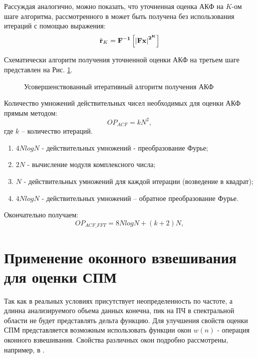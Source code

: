Рассуждая аналогично, можно показать, что уточненная оценка АКФ на ${K}$-ом шаге алгоритма, рассмотренного в \cite{ostanin_akf}
может быть получена без использования итераций с помощью выражения:
\begin{equation}
	\label{eq:akf_3}
	\hat{\bf{r}}_K = \bf{F}^{-1}\left[ \left| \bf{Fx} \right| ^{2^K} \right]
\end{equation}

Схематически алгоритм получения уточненной оценки АКФ на третьем шаге представлен на Рис. \ref{pic:akf_pic}.

\begin{figure}[h]
	\center{}
	\caption{Усовершенствованный итеративный алгоритм получения АКФ}
	\label{pic:akf_pic}
\end{figure}

Количество умножений действительных чисел необходимых для оценки АКФ прямым методом: 
\begin{equation}
	\label{eq:num_of_op_acf}
	OP_{ACF}=kN^2,
\end{equation}
где ${k}$  – количество итераций.

\begin{enumerate}
\item ${4NlogN}$ - действительных умножений - преобразование Фурье;
\item ${2N}$ - вычисление модуля комплексного числа;
\item ${N}$ - действительных умножений для каждой итерации (возведение в квадрат);
\item ${4NlogN}$ - действительных умножений – обратное преобразование Фурье. 
\end{enumerate}

Окончательно получаем:
\begin{equation}
	\label{eq:num_of_op_acf}
	OP_{ACF\_FFT}=8NlogN + (k+2)N,
\end{equation}

\section{Применение оконного взвешивания для оценки СПМ}

Так как в реальных условиях присутствует неопределенность по частоте, а длинна анализируемого объема данных конечна, пик на ПЧ в спектральной области не будет
представлять дельта функцию. Для улучшения свойств оценки СПМ представляется возможным использовать функции окон ${w(n)}$ - операция оконного взвешивания.
Свойства различных окон подробно рассмотрены, например, в \cite{shahtarin-spectrum-book, bolshakov-book}.

